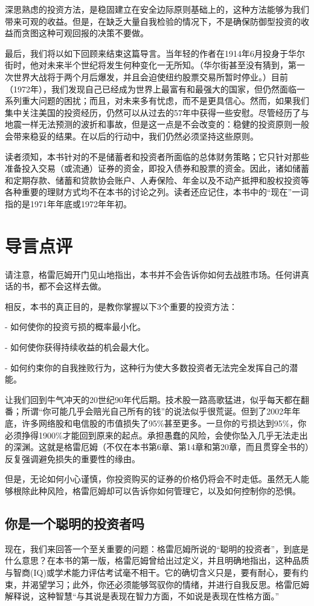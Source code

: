 \documentclass[12pt,oneside]{book}
\begin{document}
深思熟虑的投资方法，是稳固建立在安全边际原则基础上的，这种方法能够为我们带来可观的收益。但是，在缺乏大量自我检验的情况下，不是确保防御型投资的收益而贪图这种可观回报的决策不要做。

最后，我们将以如下回顾来结束这篇导言。当年轻的作者在1914年6月投身于华尔街时，他对未来半个世纪将发生何种变化一无所知。（华尔街甚至没有猜到，第一次世界大战将于两个月后爆发，并且会迫使纽约股票交易所暂时停业。）目前（1972年），我们发现自己已经成为世界上最富有和最强大的国家，但仍然面临一系列重大问题的困扰；而且，对未来多有忧虑，而不是更具信心。然而，如果我们集中关注美国的投资经历，仍然可以从过去的57年中获得一些安慰。尽管经历了与地震一样无法预测的波折和事故，但是这一点是不会改变的：稳健的投资原则一般会带来稳妥的结果。在以后的行动中，我们仍然必须坚持这些原则。

读者须知，本书针对的不是储蓄者和投资者所面临的总体财务策略；它只针对那些准备投入交易（或流通）证券的资金，即投入债券和股票的资金。因此，诸如储蓄和定期存款、储蓄和贷款协会账户、人寿保险、年金以及不动产抵押和股权投资等各种重要的理财方式均不在本书的讨论之列。读者还应记住，本书中的“现在”一词指的是1971年年底或1972年年初。

\section{导言点评}
请注意，格雷厄姆开门见山地指出，本书并不会告诉你如何去战胜市场。任何讲真话的书，都不会这样去做。

相反，本书的真正目的，是教你掌握以下3个重要的投资方法：

- 如何使你的投资亏损的概率最小化。

- 如何使你获得持续收益的机会最大化。

- 如何约束你的自我挫败行为，这种行为使大多数投资者无法完全发挥自己的潜能。

让我们回到牛气冲天的20世纪90年代后期。技术股一路高歌猛进，似乎每天都在翻番；所谓“你可能几乎会赔光自己所有的钱”的说法似乎很荒诞。但到了2002年年底，许多网络股和电信股的市值损失了95\%甚至更多。一旦你的亏损达到95\%，你必须挣得1900\%才能回到原来的起点。承担愚蠢的风险，会使你坠入几乎无法走出的深渊。这就是格雷厄姆（不仅在本书第6章、第14章和第20章，而且贯穿全书的）反复强调避免损失的重要性的缘由。

但是，无论如何小心谨慎，你投资购买的证券的价格仍将会不时走低。虽然无人能够根除此种风险，格雷厄姆却可以告诉你如何管理它，以及如何控制你的恐惧。

\subsection{你是一个聪明的投资者吗}
现在，我们来回答一个至关重要的问题：格雷厄姆所说的“聪明的投资者”，到底是什么意思？在本书的第一版，格雷厄姆曾给出过定义，并且明确地指出，这种品质与智商(IQ)或学术能力评估考试毫不相干。它的确切含义只是，要有耐心，要有约束，并渴望学习；此外，你还必须能够驾驭你的情绪，并进行自我反思。格雷厄姆解释说，这种智慧“与其说是表现在智力方面，不如说是表现在性格方面。”
\end{document}
